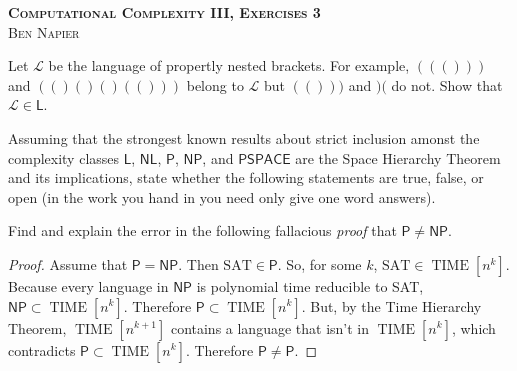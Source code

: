 \documentclass[a4paper, answers]{exam}
\begin{document}
\begin{center}
	\textbf{\textsc{Computational Complexity III, Exercises 3}} \\
	\textsc{Ben Napier}
	\vspace{1em}
\end{center}

\begin{questions}
	\question 
	Let $\mathcal L$ be the language of propertly nested brackets.
	For example, $((()))$ and $(()()()(()))$ belong to $\mathcal L$
	but $(()))$ and $)($ do not.
	Show that $\mathcal L \in \mathsf L$.

	\question
	Assuming that the strongest known results about strict inclusion 
	amonst the complexity classes $\mathsf L$, $\mathsf{NL}$,
	$\mathsf{P}$, $\mathsf{NP}$, and $\mathsf{PSPACE}$
	are the Space Hierarchy Theorem and its implications,
	state whether the following statements are true, false, or open
	(in the work you hand in you need only give one word answers).

	\question
	Find and explain the error in the following fallacious \emph{proof}
	that $\mathsf P \neq \mathsf{NP}$.
	\begin{proof}
		Assume that $\mathsf P = \mathsf{NP}$.
		Then $\text{SAT} \in \mathsf P$.
		So, for some $k$, $\text{SAT} \in \operatorname{TIME}[n^k]$.
		Because every language in $\mathsf{NP}$ is polynomial time reducible
		to SAT, $\mathsf{NP} \subset \operatorname{TIME}[n^k]$.
		Therefore $\mathsf P \subset \operatorname{TIME}[n^k]$.
		But, by the Time Hierarchy Theorem,
		$\operatorname{TIME}[n^{k+1}]$ contains a language that isn't in
		$\operatorname{TIME}[n^k]$, which contradicts 
		$\mathsf P \subset \operatorname{TIME}[n^k]$.
		Therefore $\mathsf P \neq \mathsf P$.
	\end{proof}


\end{questions}
\end{document}
